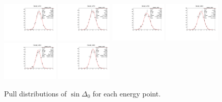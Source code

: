 \begin{figure}[h]
    \includegraphics[width=0.24\textwidth]{figure/io_wo_bkg/polarization/pull_polarization_delta0_4740.pdf}
    \includegraphics[width=0.24\textwidth]{figure/io_wo_bkg/polarization/pull_polarization_delta0_4750.pdf}
    \includegraphics[width=0.24\textwidth]{figure/io_wo_bkg/polarization/pull_polarization_delta0_4780.pdf}
    \includegraphics[width=0.24\textwidth]{figure/io_wo_bkg/polarization/pull_polarization_delta0_4840.pdf}
    \includegraphics[width=0.24\textwidth]{figure/io_wo_bkg/polarization/pull_polarization_delta0_4914.pdf}
    \includegraphics[width=0.24\textwidth]{figure/io_wo_bkg/polarization/pull_polarization_delta0_4946.pdf}
    \caption{Pull distributions of $\sin\Delta_0$ for each energy point.}
\label{fig:io_wo_bkg_pull_delta0}
\end{figure}

